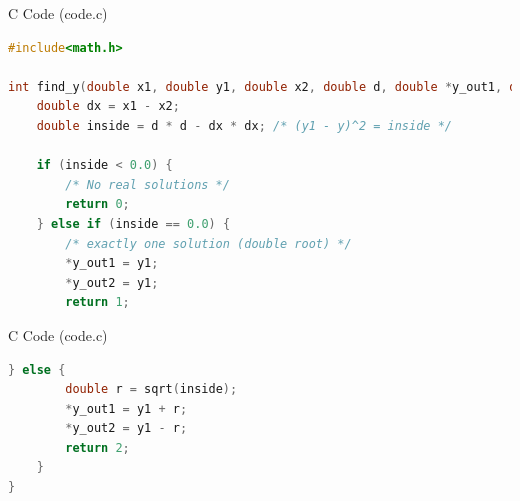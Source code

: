 \documentclass{beamer}
\begin{document}
\begin{frame}[fragile]{C Code (code.c)}
\begin{lstlisting}[language=C]
#include<math.h>

int find_y(double x1, double y1, double x2, double d, double *y_out1, double *y_out2) {
    double dx = x1 - x2;
    double inside = d * d - dx * dx; /* (y1 - y)^2 = inside */

    if (inside < 0.0) {
        /* No real solutions */
        return 0;
    } else if (inside == 0.0) {
        /* exactly one solution (double root) */
        *y_out1 = y1;
        *y_out2 = y1;
        return 1;
\end{lstlisting}
\end{frame}
\begin{frame}[fragile]{C Code (code.c)}
\begin{lstlisting}[language=C]
    } else {
        double r = sqrt(inside);
        *y_out1 = y1 + r;
        *y_out2 = y1 - r;
        return 2;
    }
}
\end{lstlisting}
\end{frame}
\end{document}
